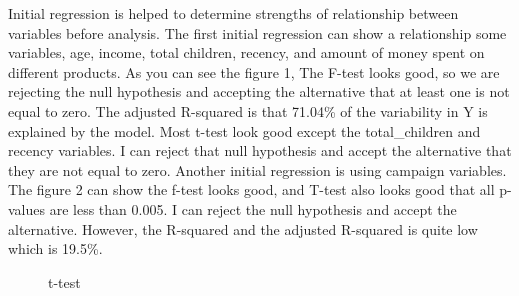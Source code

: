\documentclass[11pt]{article} %
\begin{document}
\quad Initial regression is helped to determine strengths of relationship between variables before analysis. The first initial regression can show a relationship some variables, age, income, total children, recency, and amount of money spent on different products. As you can see the figure 1, The F-test looks good, so we are rejecting the null hypothesis and accepting the alternative that at least one is not equal to zero. The adjusted R-squared is that 71.04\% of the variability in Y is explained by the model. Most t-test look good except the total\_children and recency variables. I can reject that null hypothesis and accept the alternative that they are not equal to zero. Another initial regression is using campaign variables. The figure 2 can show the f-test looks good, and T-test also looks good that all p-values are less than 0.005. I can reject the null hypothesis and accept the alternative. However, the R-squared and the adjusted R-squared is quite low which is 19.5\%. 
\begin{figure}[H]
    \centering
    \caption{t-test}
    \label{fig:foobar}
\end{figure}
\end{document}
